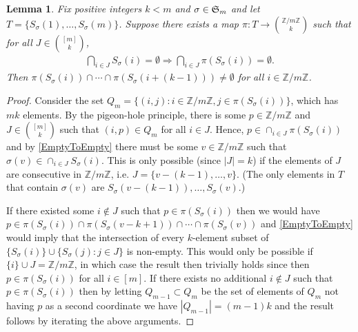 \documentclass[journal, onecolumn]{IEEEtran}
\newtheorem{lemma}{Lemma}
\begin{document}

\begin{lemma}\label{NonEmptyLemma} Fix positive integers $k < m$ and $\sigma \in \frak{S}_m$ and let $T = \{S_\sigma(1), \ldots, S_\sigma(m)\}$. Suppose there exists a map $\pi: T \to {\mathbb{Z}/m\mathbb{Z} \choose k}$ such that for all $J \in {[m] \choose k}$,
\begin{align}\label{EmptyToEmpty}
 \bigcap_{i \in J} S_\sigma(i) = \emptyset \Longrightarrow \bigcap_{i \in J} \pi(S_\sigma(i)) = \emptyset.
\end{align}
%
Then  $\pi(S_\sigma(i)) \cap \cdots \cap \pi(S_\sigma(i+(k-1))) \neq \emptyset$ for all $i \in \mathbb{Z}/m\mathbb{Z}$.
\end{lemma}

\begin{proof} Consider the set $Q_m = \{ (i,j) : i \in \mathbb{Z}/m\mathbb{Z}, j \in \pi(S_\sigma(i)) \}$, which has $mk$ elements. By the pigeon-hole principle, there is some $p \in \mathbb{Z}/m\mathbb{Z}$ and $J \in {[m] \choose k}$ such that $(i, p) \in Q_m$ for all $i \in J$. Hence, $p \in \cap_{i \in J} \pi(S_\sigma(i))$ and by \eqref{EmptyToEmpty} there must be some $v \in \mathbb{Z}/m\mathbb{Z}$ such that $\sigma(v) \in \cap_{i \in J} S_\sigma(i)$. This is only possible (since $|J| = k$) if the elements of $J$ are consecutive in $\mathbb{Z}/m\mathbb{Z}$, i.e. $J = \{v - (k-1), \ldots, v\}$. (The only elements in $T$ that contain $\sigma(v)$ are $S_\sigma(v-(k-1)), \ldots, S_\sigma(v)$.)

If there existed some $i \notin J$ such that $p \in \pi(S_\sigma(i))$ then we would have $p \in \pi(S_\sigma(i)) \cap \pi(S_\sigma(v - k+1)) \cap \cdots \cap \pi(S_\sigma(v))$ and \eqref{EmptyToEmpty} would imply that the intersection of every $k$-element subset of $\{S_\sigma(i)\} \cup \{S_\sigma(j): j \in J\}$ is non-empty. This would only be possible if $\{i\} \cup J = \mathbb{Z}/m\mathbb{Z}$, in which case the result then trivially holds since then $p \in \pi(S_\sigma(i))$ for all $i \in [m]$. If there exists no additional $i \notin J$ such that $p \in \pi(S_\sigma(i))$ then by letting $Q_{m-1} \subset Q_m$ be the set of elements of $Q_m$ not having $p$ as a second coordinate we have $|Q_{m-1}| = (m-1)k$ and the result follows by iterating the above arguments.
\end{proof}

\end{document}
